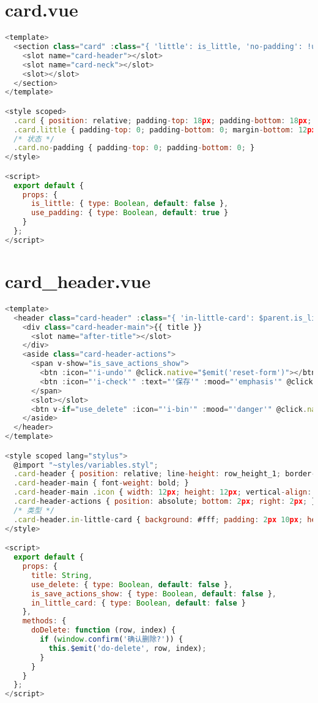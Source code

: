 \section{card.vue}


\begin{lstlisting}[language=JavaScript]
<template>
  <section class="card" :class="{ 'little': is_little, 'no-padding': !use_padding }">
    <slot name="card-header"></slot>
    <slot name="card-neck"></slot>
    <slot></slot>
  </section>
</template>

<style scoped>
  .card { position: relative; padding-top: 18px; padding-bottom: 18px; }
  .card.little { padding-top: 0; padding-bottom: 0; margin-bottom: 12px; }
  /* 状态 */
  .card.no-padding { padding-top: 0; padding-bottom: 0; }
</style>

<script>
  export default {
    props: {
      is_little: { type: Boolean, default: false },
      use_padding: { type: Boolean, default: true }
    }
  };
</script>
\end{lstlisting}

\section{card\_header.vue}



\begin{lstlisting}[language=JavaScript]
<template>
  <header class="card-header" :class="{ 'in-little-card': $parent.is_little }">
    <div class="card-header-main">{{ title }}
      <slot name="after-title"></slot>
    </div>
    <aside class="card-header-actions">
      <span v-show="is_save_actions_show">
        <btn :icon="'i-undo'" @click.native="$emit('reset-form')"></btn>
        <btn :icon="'i-check'" :text="'保存'" :mood="'emphasis'" @click.native="$emit('save-form')"></btn>
      </span>
      <slot></slot>
      <btn v-if="use_delete" :icon="'i-bin'" :mood="'danger'" @click.native="doDelete"></btn>
    </aside>
  </header>
</template>

<style scoped lang="stylus">
  @import "~styles/variables.styl";
  .card-header { position: relative; line-height: row_height_1; border-bottom: 1px solid light_gray_1; margin-bottom: 10px; }
  .card-header-main { font-weight: bold; }
  .card-header-main .icon { width: 12px; height: 12px; vertical-align: -2px; margin-left: 5px; }
  .card-header-actions { position: absolute; bottom: 2px; right: 2px; }
  /* 类型 */
  .card-header.in-little-card { background: #fff; padding: 2px 10px; height: 26px; margin-bottom: 0; border: none; }
</style>

<script>
  export default {
    props: {
      title: String,
      use_delete: { type: Boolean, default: false },
      is_save_actions_show: { type: Boolean, default: false },
      in_little_card: { type: Boolean, default: false }
    },
    methods: {
      doDelete: function (row, index) {
        if (window.confirm('确认删除?')) {
          this.$emit('do-delete', row, index);
        }
      }
    }
  };
</script>

\end{lstlisting}


